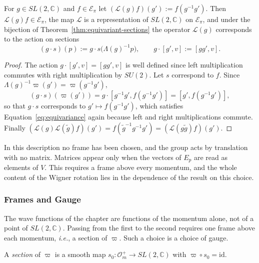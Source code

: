 \begin{proposition}\label{prop:action-equivariant}
	For $g\in SL(2,\mathbb{C})$ and $f\in\mathcal{E}_\pi$ let $(\mathcal{L}(g)f)(g'):=f(g^{-1}g')$. Then $\mathcal{L}(g)f\in\mathcal{E}_\pi$, the map $\mathcal{L}$ is a representation of $SL(2,\mathbb{C})$ on $\mathcal{E}_\pi$, and under the bijection of Theorem~\ref{thm:equivariant-sections} the operator $\mathcal{L}(g)$ corresponds to the action on sections
	\begin{equation*}
		(g\cdot s)(p):=g\cdot s\big(\Lambda(g)^{-1}p\big),\qquad g\cdot[g',v]:=[gg',v].
	\end{equation*}
\end{proposition}

\begin{proof}
	The action $g\cdot[g',v]=[gg',v]$ is well defined since left multiplication commutes with right multiplication by $SU(2)$. Let $s$ correspond to $f$. Since $\Lambda(g)^{-1}\varpi(g')=\varpi(g^{-1}g')$,
	\begin{equation*}
		(g\cdot s)(\varpi(g'))=g\cdot[g^{-1}g',f(g^{-1}g')]=[g',f(g^{-1}g')],
	\end{equation*}
	so that $g\cdot s$ corresponds to $g'\mapsto f(g^{-1}g')$, which satisfies Equation~\eqref{eq:equivariance} again because left and right multiplications commute. Finally $(\mathcal{L}(g)\mathcal{L}(\tilde{g})f)(g')=f(\tilde{g}^{-1}g^{-1}g')=(\mathcal{L}(g\tilde{g})f)(g')$.
\end{proof}

\begin{remark}
	In this description no frame has been chosen, and the group acts by translation with no matrix. Matrices appear only when the vectors of $E_p$ are read as elements of $V$. This requires a frame above every momentum, and the whole content of the Wigner rotation lies in the dependence of the result on this choice.
\end{remark}

\subsubsection*{Frames and Gauge}

The wave functions of the chapter are functions of the momentum alone, not of a point of $SL(2,\mathbb{C})$. Passing from the first to the second requires one frame above each momentum, \textit{i.e.}, a section of $\varpi$. Such a choice is a choice of gauge.

\begin{definition}\label{def:section-principal}
	A \emph{section} of $\varpi$ is a smooth map $s_0:\mathcal{O}_m^+\to SL(2,\mathbb{C})$ with $\varpi\circ s_0=\mathrm{id}$.
\end{definition}

